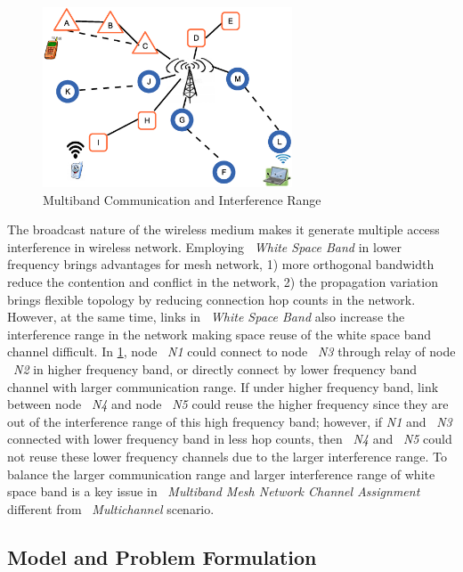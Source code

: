 \begin{figure}                                                                                                                     
\centering
\includegraphics[width=74mm]{figures/interferencerange}
\vspace{-0.1in}
\caption{Multiband Communication and Interference Range}
\label{fig:interferencerange}
\end{figure}


The broadcast nature of the wireless medium makes it generate multiple access interference in wireless network.
Employing ~\emph{White Space Band} in lower frequency brings advantages for mesh network, 1) more orthogonal bandwidth reduce the contention and conflict in the network,
 2) the propagation variation brings flexible topology by reducing connection hop counts in the network.
However, at the same time, links in ~\emph{White Space Band} also increase the interference range in the network making space reuse of the white space band channel difficult. 
In \ref{fig:interferencerange}, node ~\emph{N1} could connect to node ~\emph{N3} through relay of node ~\emph{N2} in higher frequency band, or directly connect by lower frequency band channel with larger communication range.
If under higher frequency band, link between node ~\emph{N4} and node ~\emph{N5} could reuse the higher frequency since they are out of the interference range of this high frequency band; 
however, if \emph{N1} and ~\emph{N3} connected with lower frequency band in less hop counts, then ~\emph{N4} and ~\emph{N5} could not reuse these lower frequency channels due to the larger interference range.
To balance the larger communication range and larger interference range of white space band is a key issue in ~\emph{Multiband Mesh Network Channel Assignment} different from ~\emph{Multichannel} scenario.

\subsection{Model and Problem Formulation}
\label{subsec:problem}

